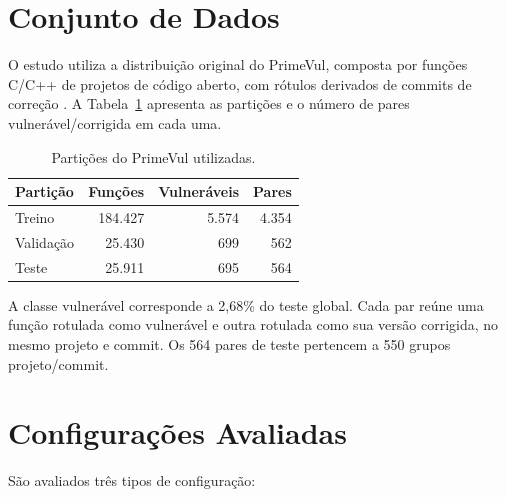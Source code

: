 \section{Conjunto de Dados}

O estudo utiliza a distribuição original do PrimeVul, composta por funções C/C++ de projetos de código aberto, com rótulos derivados de commits de correção \cite{ding2024primevul}. A Tabela~\ref{tab:particoes} apresenta as partições e o número de pares vulnerável/corrigida em cada uma.

\begin{table}[H]
    \centering
    \caption{Partições do PrimeVul utilizadas.}
    \label{tab:particoes}
    \begin{tabular}{lrrr}
        \toprule
        \textbf{Partição} & \textbf{Funções} & \textbf{Vulneráveis} & \textbf{Pares} \\
        \midrule
        Treino & 184.427 & 5.574 & 4.354 \\
        Validação & 25.430 & 699 & 562 \\
        Teste & 25.911 & 695 & 564 \\
        \bottomrule
    \end{tabular}
\end{table}

A classe vulnerável corresponde a 2,68\% do teste global. Cada par reúne uma função rotulada como vulnerável e outra rotulada como sua versão corrigida, no mesmo projeto e commit. Os 564 pares de teste pertencem a 550 grupos projeto/commit.

\section{Configurações Avaliadas}

São avaliados três tipos de configuração:

